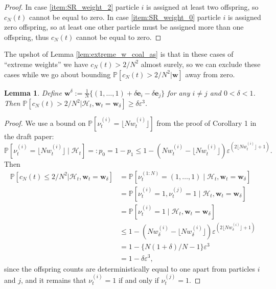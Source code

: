\documentclass{article}
\newtheorem{lemma}{Lemma}
\newcommand{\PR}{\mathbb{P}}
\begin{document}
\begin{proof}
In case \ref{item:SR_weight_2} particle $i$ is assigned at least two offspring, so $c_N(t)$ cannot be equal to zero.
In case \ref{item:SR_weight_0} particle $i$ is assigned zero offspring, so at least one other particle must be assigned more than one offspring, thus $c_N(t)$ cannot be equal to zero.
\end{proof}

The upshot of Lemma \ref{lem:extreme_w_coal_as} is that in these cases of ``extreme weights'' we have $c_N(t) > 2/N^2$ almost surely, so we can exclude these cases while we go about bounding $\PR[c_N(t) > 2/N^2 | \mathbf{w}]$ away from zero.


\begin{lemma}\label{lem:weps_cN_prob}
Define $\mathbf{w}^\delta := \frac{1}{N}\{(1,\dots,1) + \delta \mathbf{e}_i - \delta \mathbf{e}_j \}$ for any $i \neq j$ and $0< \delta < 1$. Then $\PR[c_N(t) > 2/N^2 | \mathcal{H}_t, \mathbf{w}_t = \mathbf{w}_\delta] \geq \delta \varepsilon^3$.
\end{lemma}

\begin{proof}
We use a bound on $\PR[ \nu_t^{(i)} = \lfloor N w_t^{(i)} \rfloor ]$ from the proof of Corollary 1 in the draft paper:
\begin{equation*}
\PR[ \nu_t^{(i)} = \lfloor N w_t^{(i)} \rfloor \mid \mathcal{H}_t] =: p_0 = 1-p_1 \leq 1 - (Nw_t^{(i)} - \lfloor N w_t^{(i)} \rfloor ) \varepsilon^{(2\lfloor N w_t^{(i)} \rfloor +1)} .
\end{equation*}
Then
\begin{align*}
\PR[c_N(t) \leq 2/N^2 | \mathcal{H}_t, \mathbf{w}_t = \mathbf{w}_\delta]
&= \PR[\nu_t^{(1:N)} = (1,\dots, 1) \mid \mathcal{H}_t, \mathbf{w}_t = \mathbf{w}_\delta] \\
&= \PR[\nu_t^{(i)} = 1, \nu_t^{(j)} = 1 \mid \mathcal{H}_t, \mathbf{w}_t = \mathbf{w}_\delta] \\
&= \PR[\nu_t^{(i)} = 1 \mid \mathcal{H}_t, \mathbf{w}_t = \mathbf{w}_\delta] \\
&\leq 1- (N w_\delta^{(i)} - \lfloor N w_\delta^{(i)} \rfloor) \varepsilon^{(2\lfloor N w_\delta^{(i)} \rfloor +1)} \\
&= 1- \{N(1+ \delta)/N - 1\}\varepsilon^3 \\
&= 1 - \delta\varepsilon^3 ,
\end{align*}
since the offspring counts are deterministically equal to one apart from particles $i$ and $j$, and it remains that $\nu_t^{(i)} = 1$ if and only if $\nu_t^{(j)} = 1$.
\end{proof}
\end{document}
